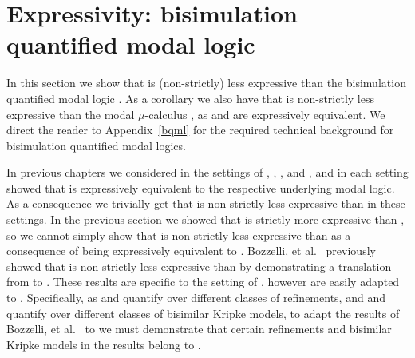 \section{Expressivity: bisimulation quantified modal logic}\label{rml-k4-bqml}

In this section we show that \logicRmlKF{} is (non-strictly) less expressive than the bisimulation quantified modal logic \logicBqmlKF{}.
As a corollary we also have that \logicRmlKF{} is non-strictly less expressive than the modal $\mu$-calculus \logicMuKF{}, as \logicBqmlKF{} and \logicMuKF{} are expressively equivalent.
We direct the reader to Appendix~\ref{bqml} for the required technical background for bisimulation quantified modal logics.

In previous chapters we considered \logicRml{} in the settings of \classK{}, \classKFF{}, \classKD{}, and \classS{}, and in each setting showed that \logicRml{} is expressively equivalent to the respective underlying modal logic.
As a consequence we trivially get that \logicRml{} is non-strictly less expressive than \logicBqml{} in these settings.
In the previous section we showed that \logicRmlKF{} is strictly more expressive than \logicKF{}, so we cannot simply show that \logicRmlKF{} is non-strictly less expressive than \logicBqmlKF{} as a consequence of \logicRmlKF{} being expressively equivalent to \logicKF{}.
Bozzelli, et al.~\cite{bozzelli:2014b} previously showed that \logicRmlK{} is non-strictly less expressive than \logicBqmlK{} by demonstrating a translation from \langRml{} to \langBqml{}.
These results are specific to the setting of \classK{}, however are easily adapted to \classKF{}.
Specifically, as \logicRmlK{} and \logicRmlKF{} quantify over different classes of refinements, and \logicBqmlK{} and \logicBqmlKF{} quantify over different classes of bisimilar Kripke models, to adapt the results of Bozzelli, et al.~\cite{bozzelli:2014b} to \logicRmlKF{} we must demonstrate that certain refinements and bisimilar Kripke models in the results belong to \classKF{}.

